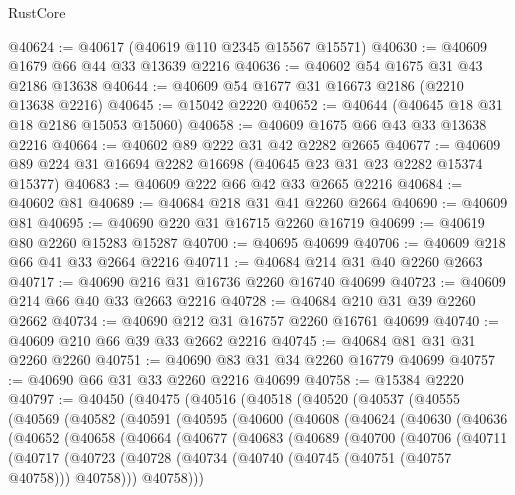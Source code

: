 \begin{lexlean}{RustCore}
\begin{coremodule}
@40624 := @40617 (@40619 @110 @2345 @15567 @15571)
@40630 := @40609 @1679 @66 @44 @33 @13639 @2216
@40636 := @40602 @54 @1675 @31 @43 @2186 @13638
@40644 := @40609 @54 @1677 @31 @16673 @2186 (@2210 @13638 @2216)
@40645 := @15042 @2220
@40652 := @40644 (@40645 @18 @31 @18 @2186 @15053 @15060)
@40658 := @40609 @1675 @66 @43 @33 @13638 @2216
@40664 := @40602 @89 @222 @31 @42 @2282 @2665
@40677 := @40609 @89 @224 @31 @16694 @2282 @16698 (@40645 @23 @31 @23 @2282 @15374 @15377)
@40683 := @40609 @222 @66 @42 @33 @2665 @2216
@40684 := @40602 @81
@40689 := @40684 @218 @31 @41 @2260 @2664
@40690 := @40609 @81
@40695 := @40690 @220 @31 @16715 @2260 @16719
@40699 := @40619 @80 @2260 @15283 @15287
@40700 := @40695 @40699
@40706 := @40609 @218 @66 @41 @33 @2664 @2216
@40711 := @40684 @214 @31 @40 @2260 @2663
@40717 := @40690 @216 @31 @16736 @2260 @16740 @40699
@40723 := @40609 @214 @66 @40 @33 @2663 @2216
@40728 := @40684 @210 @31 @39 @2260 @2662
@40734 := @40690 @212 @31 @16757 @2260 @16761 @40699
@40740 := @40609 @210 @66 @39 @33 @2662 @2216
@40745 := @40684 @81 @31 @31 @2260 @2260
@40751 := @40690 @83 @31 @34 @2260 @16779 @40699
@40757 := @40690 @66 @31 @33 @2260 @2216 @40699
@40758 := @15384 @2220
@40797 := @40450
    (@40475
      (@40516
        (@40518
          (@40520
            (@40537
              (@40555
                (@40569
                  (@40582
                    (@40591
                      (@40595
                        (@40600
                          (@40608
                            (@40624
                              (@40630
                                (@40636
                                  (@40652
                                    (@40658
                                      (@40664
                                        (@40677
                                          (@40683
                                            (@40689
                                              (@40700
                                                (@40706
                                                  (@40711
                                                    (@40717
                                                      (@40723
                                                        (@40728
                                                          (@40734
                                                            (@40740
                                                              (@40745 (@40751 (@40757 @40758)))
                                                              @40758)))
                                                        @40758)))

\end{coremodule}
\end{lexlean}
